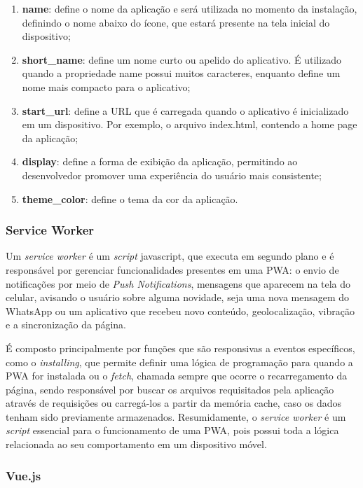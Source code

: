 \documentclass[12pt]{article}
\begin{document}
\begin{enumerate}
    \item \textbf{name}: define o nome da aplicação e será utilizada no momento da instalação, definindo o nome abaixo do ícone, que estará presente na tela inicial do dispositivo;
    \item \textbf{short\_name}: define um nome curto ou apelido do aplicativo. É utilizado quando a propriedade name possui muitos caracteres, enquanto define um nome mais compacto para o  aplicativo;
    \item \textbf{start\_url}: define a URL que é carregada quando o aplicativo é inicializado em um dispositivo. Por exemplo, o arquivo index.html, contendo a home page da aplicação;
    \item \textbf{display}: define a forma de exibição da aplicação, permitindo ao desenvolvedor promover uma experiência do usuário mais consistente;
    \item \textbf{theme\_color}: define o tema da cor da aplicação.
\end{enumerate}

\subsubsection{Service Worker} \label{sec:service_worker}

Um \textit{service worker} é um \textit{script} javascript, que executa em segundo plano e é responsável por gerenciar funcionalidades presentes em uma PWA: o envio de notificações por meio de \textit{Push Notifications}, mensagens que aparecem na tela do celular, avisando o usuário sobre alguma novidade, seja uma nova mensagem do WhatsApp ou um aplicativo que recebeu novo conteúdo, geolocalização, vibração e a sincronização da página. 
  
É composto principalmente por funções que são responsivas a eventos específicos, como o \textit{installing}, que permite definir uma lógica de programação para quando a PWA for instalada ou o \textit{fetch}, chamada sempre que ocorre o recarregamento da página, sendo responsável por buscar os arquivos requisitados pela aplicação através de requisições ou carregá-los  a partir da memória cache, caso os dados tenham sido previamente armazenados. Resumidamente, o \textit{service worker} é um \textit{script} essencial para o funcionamento de uma PWA, pois possui toda a lógica relacionada ao seu comportamento em um dispositivo móvel.

\subsubsection{Vue.js} \label{sec:vuejs}
\end{document}
